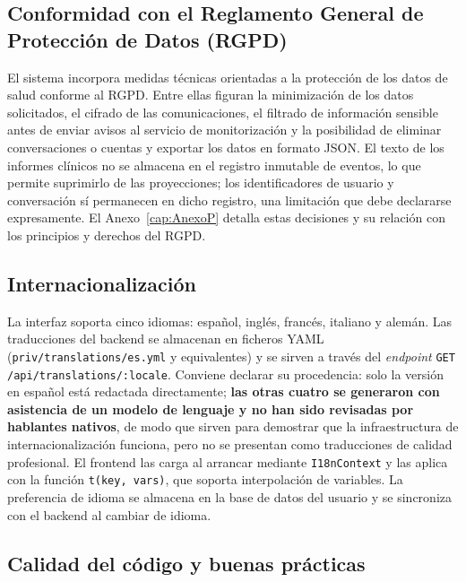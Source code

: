 \subsection{Conformidad con el Reglamento General de Protección de Datos (RGPD)}
\label{sec:rgpd}

El sistema incorpora medidas técnicas orientadas a la protección de los datos de salud conforme al RGPD. Entre ellas figuran la minimización de los datos solicitados, el cifrado de las comunicaciones, el filtrado de información sensible antes de enviar avisos al servicio de monitorización y la posibilidad de eliminar conversaciones o cuentas y exportar los datos en formato JSON. El texto de los informes clínicos no se almacena en el registro inmutable de eventos, lo que permite suprimirlo de las proyecciones; los identificadores de usuario y conversación sí permanecen en dicho registro, una limitación que debe declararse expresamente. El Anexo~\ref{cap:AnexoP} detalla estas decisiones y su relación con los principios y derechos del RGPD.

\subsection{Internacionalización}
\label{sec:i18n}

\begin{sloppypar}
La interfaz soporta cinco idiomas: español, inglés, francés, italiano y alemán. Las traducciones del backend se almacenan en ficheros YAML (\texttt{priv/translations/es.yml} y equivalentes) y se sirven a través del \emph{endpoint} \texttt{GET /api/translations/\allowbreak{}:locale}. Conviene declarar su procedencia: solo la versión en español está redactada directamente; \textbf{las otras cuatro se generaron con asistencia de un modelo de lenguaje y no han sido revisadas por hablantes nativos}, de modo que sirven para demostrar que la infraestructura de internacionalización funciona, pero no se presentan como traducciones de calidad profesional. El frontend las carga al arrancar mediante \texttt{I18nContext} y las aplica con la función \texttt{t(key, vars)}, que soporta interpolación de variables. La preferencia de idioma se almacena en la base de datos del usuario y se sincroniza con el backend al cambiar de idioma.
\end{sloppypar}

\subsection{Calidad del código y buenas prácticas}
\label{sec:calidad}

